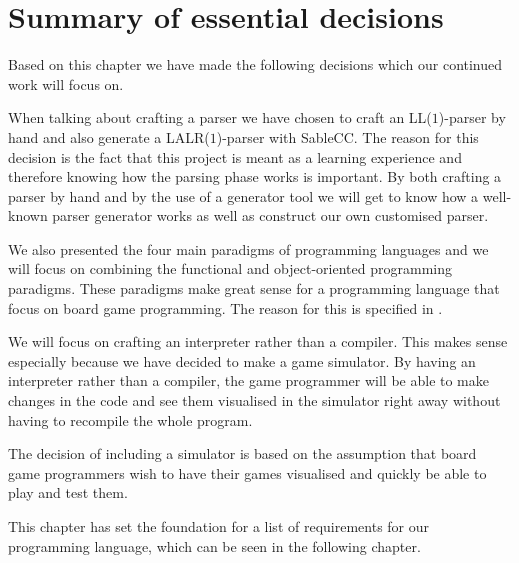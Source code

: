 \section{Summary of essential decisions}
\label{sec:summaryofdecisions}

Based on this chapter we have made the following decisions which our continued
work will focus on.

When talking about crafting a parser we have chosen to craft an LL($1$)-parser
by hand and also generate a LALR($1$)-parser with SableCC.  The reason for this
decision is the fact that this project is meant as a learning experience and
therefore knowing how the parsing phase works is important. By both crafting a
parser by hand and by the use of a generator tool we will get to know how a
well-known parser generator works as well as construct our own customised
parser.

We also presented the four main paradigms of programming languages and we will
focus on combining the functional and object-oriented programming paradigms.
These paradigms make great sense for a programming language that focus on board
game programming. The reason for this is specified in .

We will focus on crafting an interpreter rather than a compiler. This makes
sense especially because we have decided to make a game simulator. By having an
interpreter rather than a compiler, the game programmer will be able to make
changes in the code and see them visualised in the simulator right away without
having to recompile the whole program.

The decision of including a simulator is based on the assumption that board game
programmers wish to have their games visualised and quickly be able to play and
test them.

This chapter has set the foundation for a list of requirements for our
programming language, which can be seen in the following chapter.
